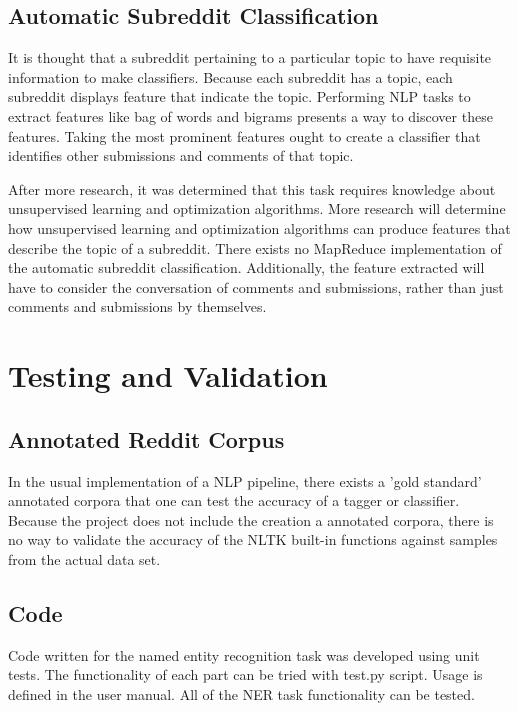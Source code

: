 \documentclass[12pt,a4paper]{article}
\begin{document}
\subsection{Automatic Subreddit Classification}

It is thought that a subreddit pertaining to a particular topic
to have requisite information to make classifiers. Because each
subreddit has a topic, each subreddit displays feature that
indicate the topic. Performing NLP tasks to extract features
like bag of words and bigrams presents a way to discover these features.
Taking the most prominent features ought to create a classifier
that identifies other submissions and comments of
that topic.

After more research, it was determined that this task requires
knowledge about unsupervised learning and optimization algorithms.
More research will determine how unsupervised learning and optimization
algorithms can produce features that describe the topic of a subreddit.
There exists no MapReduce implementation of the automatic subreddit
classification. Additionally, the feature extracted will have to
consider the conversation of comments and submissions, rather than
just comments and submissions by themselves.

\section{Testing and Validation}

\subsection{Annotated Reddit Corpus}

In the usual implementation of a NLP pipeline, there exists 
a 'gold standard' annotated corpora that one can test
the accuracy of a tagger or classifier. Because the project
does not include the creation a annotated corpora, there
is no way to validate the accuracy of the NLTK built-in functions
against samples from the actual data set.

\subsection{Code}

Code written for the named entity recognition task was developed
using unit tests. The functionality of each part can be tried
with test.py script. Usage is defined in the user manual. All
of the NER task functionality can be tested.
\end{document}
